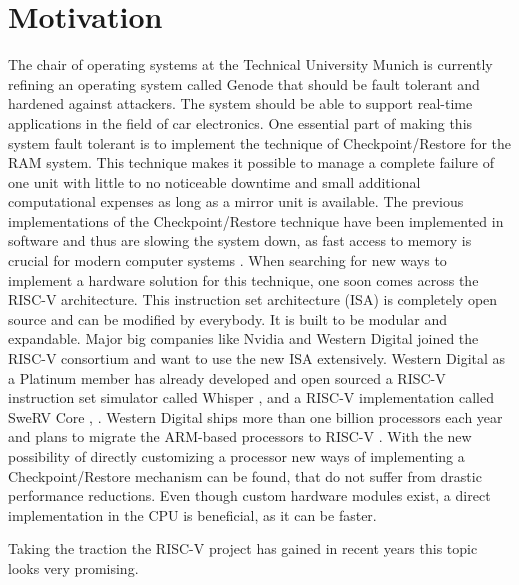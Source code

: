 \chapter{Motivation}\label{chap:motivation}
The chair of operating systems at the Technical University Munich is currently 
refining an operating system called Genode that should be fault tolerant
and hardened against attackers.
The system should be able to support real-time applications in the
field of car electronics. One essential part of making this system
fault tolerant is to implement the technique of Checkpoint/Restore for
the RAM system. This technique makes it possible to manage a complete failure of
one unit with little to no noticeable downtime and small additional
computational expenses as long as a mirror unit is available.
The previous implementations of the Checkpoint/Restore technique have
been implemented in software and thus are slowing the system down,
as fast access to memory is crucial for modern computer
systems \cite{sebastian_bachmaier_optimizing_genode_cr_fpga}.
When searching for new ways to implement a hardware solution
for this technique, one soon comes across the RISC-V architecture.
This instruction set architecture (ISA) is completely open source
and can be modified by everybody. It is built to be modular and expandable.
Major big companies like Nvidia \cite{risc-v_member_nvidia} and 
Western Digital \cite{risc-v_member_wd}
joined the RISC-V consortium and want to use the new ISA extensively.
Western Digital as a Platinum member has already developed and
open sourced a RISC-V
instruction set simulator called Whisper \cite{wd_github_whisper}, \cite{github_swerv_iss} and a
RISC-V implementation called SweRV Core \cite{wd_swerv_core}, \cite{github_swerv_core}.
Western Digital ships more than one billion processors each year
and plans to migrate the ARM-based processors to RISC-V
\cite{risc-v_news_wd_one_billion_chips}.
With the new possibility of directly customizing a processor new
ways of implementing a Checkpoint/Restore mechanism can be found,
that do not suffer from drastic performance reductions.
Even though custom hardware modules exist, a direct implementation
in the CPU is beneficial, as it can be faster.

Taking the traction the RISC-V project has gained in recent years
this topic looks very promising.